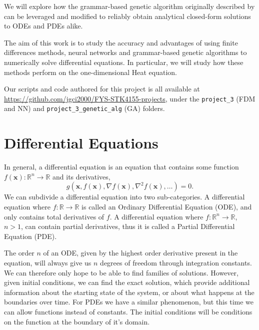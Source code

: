 \documentclass[aps,reprint,superscriptaddress,nofootinbib]{revtex4-2}
\begin{document}
    We will explore how the grammar-based genetic algorithm originally described by \cite{solving_diff_reproduce} can be leveraged and modified to reliably obtain analytical closed-form solutions to ODEs and PDEs alike.

    The aim of this work is to study the accuracy and advantages of using finite differences methods, neural networks and grammar-based genetic algorithms to numerically solve differential equations. In particular, we will study how these methods perform on the one-dimensional Heat equation.
    
    Our scripts and code authored for this project is all available at \url{https://github.com/jgci2000/FYS-STK4155-projects}, under the \texttt{project\_3} (FDM and NN) and \texttt{project\_3\_genetic\_alg} (GA) folders.

\section{Differential Equations}

    In general, a differential equation is an equation that contains some function \(f(\bm x):\mathbb{R}^n\to\mathbb{R}\) and its derivatives,
    \begin{equation*}
        g(\bm x, f(\bm x), \nabla f(\bm x), \nabla^2 f(\bm x), \ldots) = 0.
    \end{equation*}
    We can subdivide a differential equation into two sub-categories. A differential equation where \(f:\mathbb{R}\to\mathbb{R}\) is called an Ordinary Differential Equation (ODE), and only contains total derivatives of \(f\). %
    A differential equation  where \(f:\mathbb{R}^n\to\mathbb{R}\), \(n > 1\), can contain partial derivatives, thus it is called a Partial Differential Equation (PDE).%
    
    The order \(n\) of an ODE, given by the highest order derivative present in the equation, will always give us \(n\) degrees of freedom through integration constants. We can therefore only hope to be able to find families of solutions. However, given initial conditions, we can find the exact solution, which provide additional information about the starting state of the system, or about what happens at the boundaries over time. For PDEs we have a similar phenomenon, but this time we can allow functions instead of constants. The initial conditions will be conditions on the function at the boundary of it's domain. 
    
\end{document}
